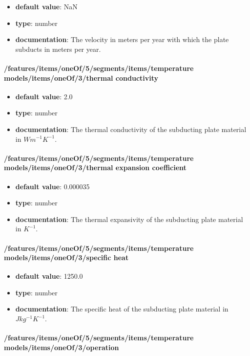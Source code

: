 \begin{itemize}\item {\bf default value}: NaN
\item {\bf type}: number
\item {\bf documentation}: The velocity in meters per year with which the plate subducts in meters per year.
\end{itemize}\paragraph{/features/items/oneOf/5/segments/items/temperature models/items/oneOf/3/thermal conductivity}
\begin{itemize}\item {\bf default value}: 2.0
\item {\bf type}: number
\item {\bf documentation}: The thermal conductivity of the subducting plate material in $W m^{-1} K^{-1}$.
\end{itemize}\paragraph{/features/items/oneOf/5/segments/items/temperature models/items/oneOf/3/thermal expansion coefficient}
\begin{itemize}\item {\bf default value}: 0.000035
\item {\bf type}: number
\item {\bf documentation}: The thermal expansivity of the subducting plate material in $K^{-1}$.
\end{itemize}\paragraph{/features/items/oneOf/5/segments/items/temperature models/items/oneOf/3/specific heat}
\begin{itemize}\item {\bf default value}: 1250.0
\item {\bf type}: number
\item {\bf documentation}: The specific heat of the subducting plate material in $J kg^{-1} K^{-1}$.
\end{itemize}\paragraph{/features/items/oneOf/5/segments/items/temperature models/items/oneOf/3/operation}
